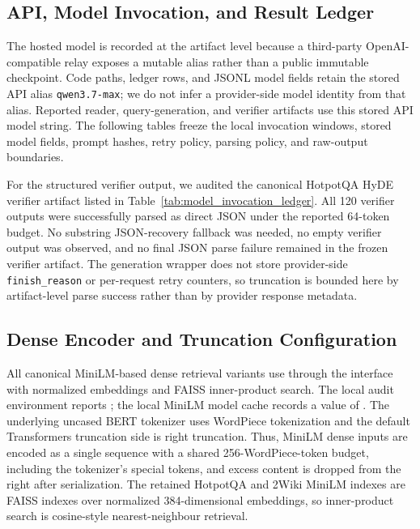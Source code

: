 \documentclass[pdflatex,sn-basic,Numbered]{sn-jnl}
\begin{document}
\subsection{API, Model Invocation, and Result Ledger}

The hosted model is recorded at the artifact level because a third-party OpenAI-compatible relay exposes a mutable alias rather than a public immutable checkpoint. Code paths, ledger rows, and JSONL model fields retain the stored API alias \texttt{qwen3.7-max}; we do not infer a provider-side model identity from that alias. Reported reader, query-generation, and verifier artifacts use this stored API model string. The following tables freeze the local invocation windows, stored model fields, prompt hashes, retry policy, parsing policy, and raw-output boundaries.




For the structured verifier output, we audited the canonical HotpotQA HyDE verifier artifact
listed in Table~\ref{tab:model_invocation_ledger}.
All 120 verifier outputs were successfully parsed as direct JSON under the reported 64-token
budget. No substring JSON-recovery fallback was needed, no empty verifier output was observed,
and no final JSON parse failure remained in the frozen verifier artifact. The generation wrapper
does not store provider-side \texttt{finish\_reason} or per-request retry counters, so truncation
is bounded here by artifact-level parse success rather than by provider response metadata.

\subsection{Dense Encoder and Truncation Configuration}
\label{sec:supp_dense_encoder_truncation}

All canonical MiniLM-based dense retrieval variants use  through the  interface with normalized embeddings and FAISS inner-product search. The local audit environment reports ; the local MiniLM model cache records a  value of . The underlying uncased BERT tokenizer uses WordPiece tokenization and the default Transformers truncation side is right truncation. Thus, MiniLM dense inputs are encoded as a single sequence with a shared 256-WordPiece-token budget, including the tokenizer's special tokens, and excess content is dropped from the right after serialization. The retained HotpotQA and 2Wiki MiniLM indexes are FAISS  indexes over normalized 384-dimensional embeddings, so inner-product search is cosine-style nearest-neighbour retrieval.
\end{document}
